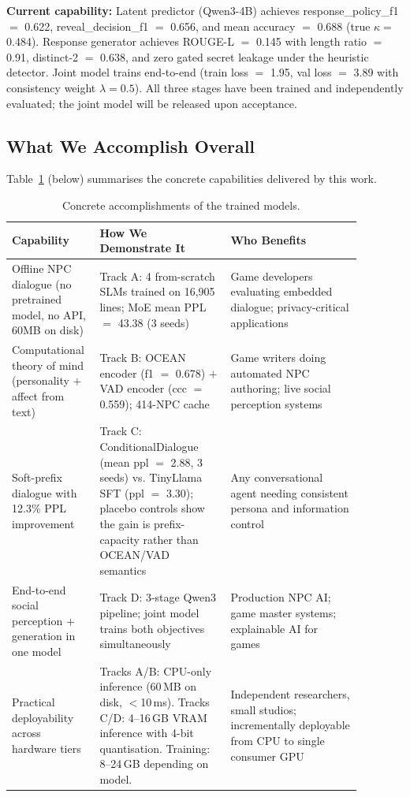 \documentclass[11pt]{article}
\begin{document}
\textbf{Current capability:} Latent predictor (Qwen3-4B) achieves response\_policy\_f1 $=$ 0.622, reveal\_decision\_f1 $=$ 0.656, and mean accuracy $=$ 0.688 (true $\kappa{=}$0.484).
Response generator achieves ROUGE-L $=$ 0.145 with length ratio $=$ 0.91, distinct-2 $=$ 0.638, and zero gated secret leakage under the heuristic detector.
Joint model trains end-to-end (train loss $=$ 1.95, val loss $=$ 3.89 with consistency weight $\lambda{=}0.5$).
All three stages have been trained and independently evaluated; the joint model will be released upon acceptance.

\subsection{What We Accomplish Overall}

Table~\ref{tab:accomplish} (below) summarises the concrete capabilities delivered by this work.

\begin{table}[h]
\centering
\caption{Concrete accomplishments of the trained models.}
\label{tab:accomplish}
\small
\begin{tabular}{@{}p{0.18\linewidth}p{0.35\linewidth}p{0.35\linewidth}@{}}
\toprule
\textbf{Capability} & \textbf{How We Demonstrate It} & \textbf{Who Benefits} \\
\midrule
Offline NPC dialogue (no pretrained model, no API, 60MB on disk)
    & Track A: 4 from-scratch SLMs trained on 16,905 lines; MoE mean PPL $=$ 43.38 (3 seeds)
    & Game developers evaluating embedded dialogue; privacy-critical applications \\
\midrule
Computational theory of mind (personality $+$ affect from text)
    & Track B: OCEAN encoder (f1 $=$ 0.678) $+$ VAD encoder (ccc $=$ 0.559); 414-NPC cache
    & Game writers doing automated NPC authoring; live social perception systems \\
\midrule
Soft-prefix dialogue with 12.3\% PPL improvement
    & Track C: ConditionalDialogue (mean ppl $=$ 2.88, 3 seeds) vs. TinyLlama SFT (ppl $=$ 3.30); placebo controls show the gain is prefix-capacity rather than OCEAN/VAD semantics
    & Any conversational agent needing consistent persona and information control \\
\midrule
End-to-end social perception $+$ generation in one model
    & Track D: 3-stage Qwen3 pipeline; joint model trains both objectives simultaneously
    & Production NPC AI; game master systems; explainable AI for games \\
\midrule
Practical deployability across hardware tiers
    & Tracks A/B: CPU-only inference (60\,MB on disk, {$<$}10\,ms). Tracks C/D: 4--16\,GB VRAM inference with 4-bit quantisation. Training: 8--24\,GB depending on model.
    & Independent researchers, small studios; incrementally deployable from CPU to single consumer GPU \\
\bottomrule
\end{tabular}
\end{table}
\end{document}
